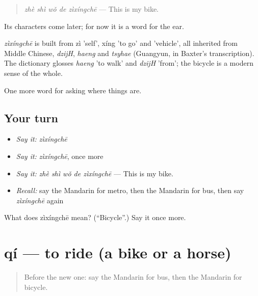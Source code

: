 \begin{quote}
\emph{zhè shì wǒ de zìxíngchē} — This is my bike.
\end{quote}

Its characters come later; for now it is a word for the ear.

\begin{cousinweb}
\emph{zìxíngchē} is built from zì 'self', xíng 'to go' and  'vehicle', all inherited from Middle Chinese, \emph{dzijH}, \emph{haeng} and \emph{tsyhae} (Guangyun, in Baxter's transcription). The dictionary glosses \emph{haeng} 'to walk' and \emph{dzijH} 'from'; the bicycle is a modern sense of the whole.
\end{cousinweb}

\begin{grammarlens}[title={What you've built}]
One more word for asking where things are.
\end{grammarlens}

\subsection*{Your turn}
\begin{itemize}
\raggedright
  \item \emph{Say it:} \emph{zìxíngchē}
  \item \emph{Say it:} \emph{zìxíngchē}, once more
  \item \emph{Say it:} \emph{zhè shì wǒ de zìxíngchē} — This is my bike.
  \item \emph{Recall:} say the Mandarin for metro, then the Mandarin for bus, then say \emph{zìxíngchē} again
\end{itemize}

\begin{tcolorbox}[breakable,colback=teal!4,colframe=teal!35!black,title={Before you move on}]
What does zìxíngchē mean? (\textquotedblleft{}Bicycle\textquotedblright{}.) Say it once more.
\end{tcolorbox}
\section[qí]{qí — to ride (a bike or a horse)}

\label{lesson:ZH-C106-qi}



\begin{quote}
Before the new one: say the Mandarin for bus, then the Mandarin for bicycle.
\end{quote}

